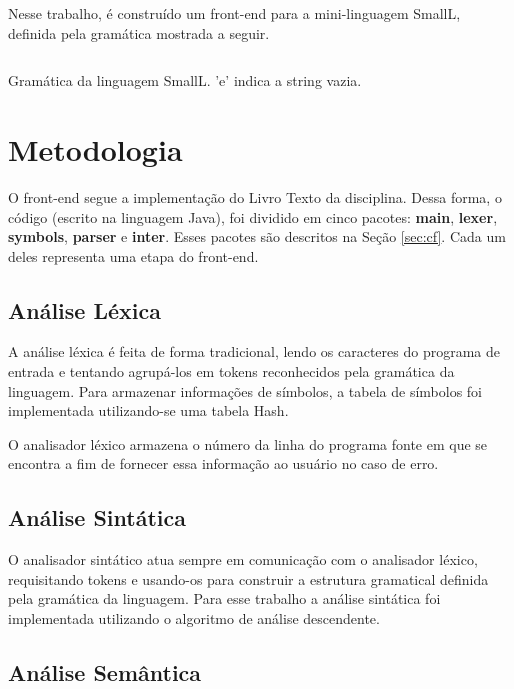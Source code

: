 \documentclass[a4paper,12pt]{report}
\begin{document}
Nesse trabalho, é construído um front-end para a mini-linguagem SmallL, definida pela gramática mostrada a seguir.

\begin{mdframed}[linecolor=black, leftline=false, rightline=false]
  \inputminted[linenos, fontsize=\footnotesize]{text}{grammar.txt}
\end{mdframed}

\begin{center}
 Gramática da linguagem SmallL. 'e' indica a string vazia.
\end{center}

\section{Metodologia}

O front-end segue a implementação do Livro Texto da disciplina. Dessa forma, o código (escrito na linguagem
Java), foi dividido em cinco pacotes: \textbf{main}, \textbf{lexer}, \textbf{symbols}, \textbf{parser} e
\textbf{inter}. Esses pacotes são descritos na Seção \ref{sec:cf}. Cada um deles representa uma etapa do front-end.

\subsection{Análise Léxica}

A análise léxica é feita de forma tradicional, lendo os caracteres do programa de entrada e tentando agrupá-los 
em tokens reconhecidos pela gramática da linguagem. Para armazenar informações de símbolos, a tabela de símbolos
foi implementada utilizando-se uma tabela Hash.

O analisador léxico armazena o número da linha do programa fonte em que se encontra a fim de fornecer essa
informação ao usuário no caso de erro.

\subsection{Análise Sintática}

O analisador sintático atua sempre em comunicação com o analisador léxico, requisitando tokens e usando-os
para construir a estrutura gramatical definida pela gramática da linguagem. Para esse trabalho a análise sintática
foi implementada utilizando o algoritmo de análise descendente. 

\subsection{Análise Semântica}
\end{document}
